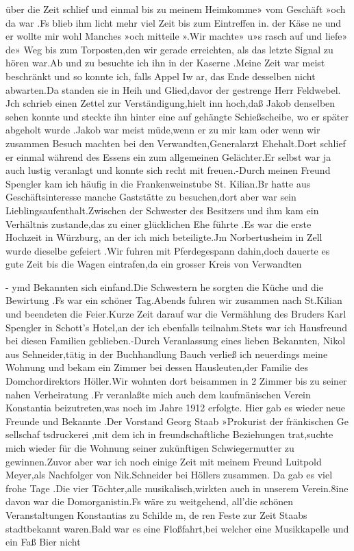 \documentclass[a4paper,11pt]{article}
\begin{document}
  über die Zeit schlief und einmal bis zu meinem Heimkomme» vom Geschäft »och da war .Fs blieb ihm licht mehr viel Zeit bis zum Eintreffen in. der Käse ne und er wollte mir wohl Manches »och mitteile ».Wir machte» u»s rasch auf und liefe» de» Weg bis zum Torposten,den wir gerade erreichten, als das letzte Signal zu hören war.Ab und zu besuchte ich ihn in der Kaserne .Meine Zeit war meist beschränkt und so konnte ich, falls Appel Iw ar, das Ende desselben nicht abwarten.Da standen sie in Heih und Glied,davor der gestrenge Herr Feldwebel. Jch schrieb einen Zettel zur Verständigung,hielt inn hoch,daß Jakob denselben sehen konnte und steckte ihn hinter eine auf gehängte Schießscheibe, wo er später abgeholt wurde .Jakob war meist müde,wenn er zu mir kam oder wenn wir zusammen Besuch machten bei den Verwandten,Generalarzt Ehehalt.Dort schlief er einmal während des Essens ein zum allgemeinen Gelächter.Er selbst war ja auch lustig veranlagt und konnte sich recht mit freuen.-Durch meinen Freund Spengler kam ich häufig in die Frankenweinstube St. Kilian.Br hatte aus Geschäftsinteresse manche Gaststätte zu besuchen,dort aber war sein Lieblingsaufenthalt.Zwischen der Schwester des Besitzers und ihm kam ein Verhältnis zustande,das zu einer glücklichen Ehe führte .Es war die erste Hochzeit in Würzburg, an der ich mich beteiligte.Jm Norbertusheim in Zell wurde dieselbe gefeiert .Wir fuhren mit Pferdegespann dahin,doch dauerte es gute Zeit bis die Wagen eintrafen,da ein grosser Kreis von Verwandten

- ymd Bekannten sich einfand.Die Schwestern he sorgten die Küche und die Bewirtung .Fs war ein schöner Tag.Abends fuhren wir zusammen nach St.Kilian und beendeten die Feier.Kurze Zeit darauf war die Vermählung des Bruders Karl Spengler in Schott’s Hotel,an der ich ebenfalls teilnahm.Stets war ich Hausfreund bei diesen Familien geblieben.-Durch Veranlassung eines lieben Bekannten, Nikol aus Sehneider,tätig in der Buchhandlung Bauch verließ ich neuerdings meine Wohnung und bekam ein Zimmer bei dessen Hausleuten,der Familie des Domchordirektors Höller.Wir wohnten dort beisammen in 2 Zimmer bis zu seiner nahen Verheiratung .Fr veranlaßte mich auch dem kaufmänischen Verein Konstantia beizutreten,was noch im Jahre 1912 erfolgte. Hier gab es wieder neue Freunde und Bekannte .Der Vorstand Georg Staab »Prokurist der fränkischen Ge sellschaf tsdruckerei ,mit dem ich in freundschaftliche Beziehungen trat,suchte mich wieder für die Wohnung seiner zukünftigen Schwiegermutter zu gewinnen.Zuvor aber war ich noch einige Zeit mit meinem Freund Luitpold Meyer,als Nachfolger von Nik.Schneider bei Höllers zusammen. Da gab es viel frohe Tage .Die vier Töchter,alle musikalisch,wirkten auch in unserem Verein.8ine davon war die Domorganistin.Fs wäre zu weitgehend, all’die schönen Veranstaltungen Konstantias zu Schilde m, de ren Feste zur Zeit Staabs stadtbekannt waren.Bald war es eine Floßfahrt,bei welcher eine Musikkapelle und ein Faß Bier nicht
\end{document}

